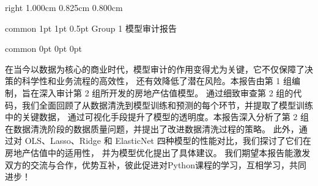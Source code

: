 \documentclass[
    report,     %
    oneside,    %
    UTF8,       %
    zihao=-4    %
]{config} %
\def \minorTitleCN {Group 1 模型审计报告} %
\begin{document}
\CoverPage
    {right} %
    {1.000cm} %
    {0.825cm} %
    {0.800cm} %


\Header
    {common} %
    {1pt} %
    {1pt} %
    {0.5pt} %
    {} %
    {\minorTitleCN}
    {} %


\Footer
    {common} %
    {0pt} %
    {0pt} %
    {0pt} %
    {} %
    {\thepage} %
    {} %


\SetRomanPageNumber{} %


\begin{abstractCN}[0.6cm] %

在当今以数据为核心的商业时代，模型审计的作用变得尤为关键，它不仅保障了决策的科学性和业务流程的高效性，
还有效降低了潜在风险。本报告由第 1 组编制，旨在深入审计第 2 组所开发的房地产估值模型。
通过细致审查第 2 组的代码，我们全面回顾了从数据清洗到模型训练和预测的每个环节，并提取了模型训练中的关键数据，
通过可视化手段提升了模型的透明度。本报告深入分析了第 2 组在数据清洗阶段的数据质量问题，并提出了改进数据清洗过程的策略。
此外，通过对 OLS、Lasso、Ridge 和 ElasticNet 四种模型的性能对比，我们探讨了它们在房地产估值中的适用性，
并为模型优化提出了具体建议。
我们期望本报告能激发双方的交流与合作，优势互补，彼此促进对Python课程的学习，互相学习，共同进步！
    
\def\keywordsCN{模型审计；线性模型；房地产估值；机器学习}

\end{abstractCN}

\end{document}

